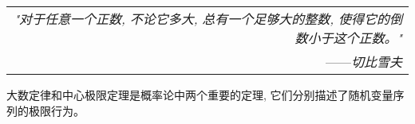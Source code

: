 \begin{flushright}
    \begin{tabular}{r|||}
        \textit{"对于任意一个正数, 不论它多大, 总有一个足够大的整数, 使得它的倒数小于这个正数。"}\\
        ——\textit{切比雪夫}
    \end{tabular}
\end{flushright}


大数定律和中心极限定理是概率论中两个重要的定理, 它们分别描述了随机变量序列的极限行为。